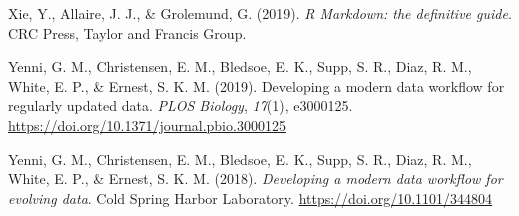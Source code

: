 \begin{CSLReferences}{1}{0}
\leavevmode{}%
Xie, Y., Allaire, J. J., \& Grolemund, G. (2019). \emph{R Markdown: the definitive guide}. CRC Press, Taylor and Francis Group.

\leavevmode{}%
Yenni, G. M., Christensen, E. M., Bledsoe, E. K., Supp, S. R., Diaz, R. M., White, E. P., \& Ernest, S. K. M. (2019). Developing a modern data workflow for regularly updated data. \emph{PLOS Biology}, \emph{17}(1), e3000125. \url{https://doi.org/10.1371/journal.pbio.3000125}

\leavevmode{}%
Yenni, G. M., Christensen, E. M., Bledsoe, E. K., Supp, S. R., Diaz, R. M., White, E. P., \& Ernest, S. K. M. (2018). \emph{Developing a modern data workflow for evolving data}. Cold Spring Harbor Laboratory. \url{https://doi.org/10.1101/344804}

\end{CSLReferences}
